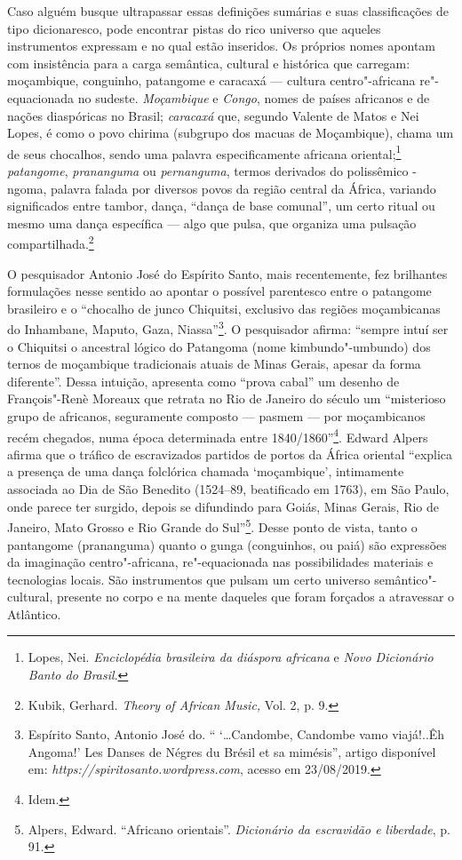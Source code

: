 Caso alguém busque ultrapassar essas definições sumárias e suas
classificações de tipo dicionaresco, pode encontrar pistas do rico
universo que aqueles instrumentos expressam e no qual estão inseridos.
Os próprios nomes apontam com insistência para a carga semântica,
cultural e histórica que carregam: moçambique, conguinho, patangome e
caracaxá --- cultura centro"-africana re"-equacionada no sudeste.
\emph{Moçambique} e \emph{Congo}, nomes de países africanos e de nações
diaspóricas no Brasil; \emph{caracaxá} que, segundo Valente de Matos e
Nei Lopes, é como o povo chirima (subgrupo dos macuas de Moçambique),
chama um de seus chocalhos, sendo uma palavra especificamente africana
oriental;\footnote{Lopes, Nei. \emph{Enciclopédia brasileira da diáspora
  africana} e \emph{Novo Dicionário Banto do Brasil}.} \emph{patangome},
\emph{prananguma} ou \emph{pernanguma}, termos derivados do polissêmico
-ngoma, palavra falada por diversos povos da região central da África,
variando significados entre tambor, dança, ``dança de base comunal'', um
certo ritual ou mesmo uma dança específica --- algo que pulsa, que
organiza uma pulsação compartilhada.\footnote{Kubik, Gerhard.
  \emph{Theory of African Music,} Vol. 2, p. 9.}

O pesquisador Antonio José do Espírito Santo, mais recentemente, fez
brilhantes formulações nesse sentido ao apontar o possível parentesco
entre o patangome brasileiro e o ``chocalho de junco Chiquitsi,
exclusivo das regiões moçambicanas do Inhambane, Maputo, Gaza,
Niassa''\footnote{Espírito Santo, Antonio José do. `` `\ldots{}Candombe,
  Candombe vamo viajá!..Êh Angoma!' Les Danses de Négres du Brésil et sa
  mimésis'', artigo disponível em:
  \emph{https://spiritosanto.wordpress.com},
  acesso em 23/08/2019.}. O pesquisador afirma: ``sempre intuí ser o
Chiquitsi o ancestral lógico do Patangoma (nome kimbundo"-umbundo) dos
ternos de moçambique tradicionais atuais de Minas Gerais, apesar da
forma diferente''. Dessa intuição, apresenta como ``prova cabal'' um
desenho de François"-Renè Moreaux que retrata no Rio de Janeiro do século
 um ``misterioso grupo de africanos, seguramente composto --- pasmem
--- por moçambicanos recém chegados, numa época determinada entre
1840/1860''\footnote{Idem.}. Edward Alpers afirma que o tráfico de
escravizados partidos de portos da África oriental ``explica a presença
de uma dança folclórica chamada `moçambique', intimamente associada ao
Dia de São Benedito (1524--89, beatificado em 1763), em São Paulo, onde
parece ter surgido, depois se difundindo para Goiás, Minas Gerais, Rio
de Janeiro, Mato Grosso e Rio Grande do Sul''\footnote{Alpers, Edward.
  ``Africano orientais''. \emph{Dicionário da escravidão e liberdade},
  p. 91.}. Desse ponto de vista, tanto o pantangome (prananguma) quanto
o gunga (conguinhos, ou paiá) são expressões da imaginação
centro"-africana, re"-equacionada nas possibilidades materiais e
tecnologias locais. São instrumentos que pulsam um certo universo
semântico"-cultural, presente no corpo e na mente daqueles que foram
forçados a atravessar o Atlântico.

